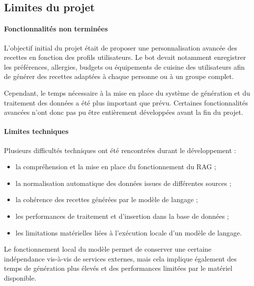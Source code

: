 \documentclass[12pt]{article}
\begin{document}
    \subsection{Limites du projet}

        \paragraph{Fonctionnalités non terminées}
            L’objectif initial du projet était de proposer une personnalisation avancée des recettes en fonction des profils utilisateurs.
            Le bot devait notamment enregistrer les préférences, allergies, budgets ou équipements de cuisine des utilisateurs afin de générer des recettes adaptées à chaque personne ou à un groupe complet.

            Cependant, le temps nécessaire à la mise en place du système de génération et du traitement des données a été plus important que prévu.
            Certaines fonctionnalités avancées n’ont donc pas pu être entièrement développées avant la fin du projet.

        \paragraph{Limites techniques}
            Plusieurs difficultés techniques ont été rencontrées durant le développement :
            \begin{itemize}
                \item la compréhension et la mise en place du fonctionnement du RAG ;
                \item la normalisation automatique des données issues de différentes sources ;
                \item la cohérence des recettes générées par le modèle de langage ;
                \item les performances de traitement et d’insertion dans la base de données ;
                \item les limitations matérielles liées à l’exécution locale d’un modèle de langage.
            \end{itemize}

            Le fonctionnement local du modèle permet de conserver une certaine indépendance vis-à-vis de services externes, mais cela implique également des temps de génération plus élevés et des performances limitées par le matériel disponible.
\end{document}
